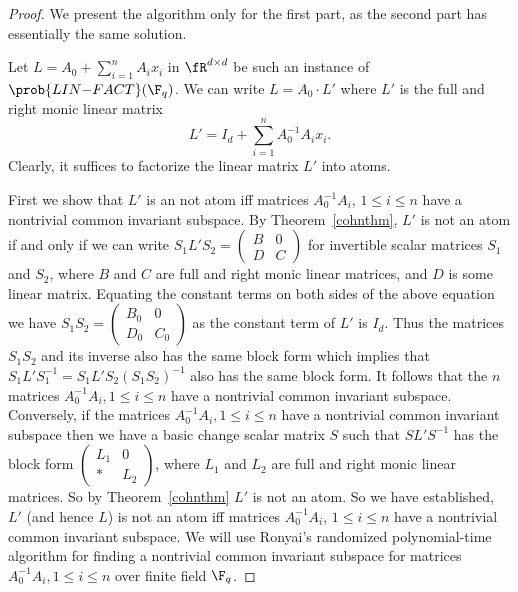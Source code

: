\begin{proof}
  We present the algorithm only for the first part, as the second part
  has essentially the same solution.
  
  Let $L=A_0+\sum_{i=1}^n A_i x_i$ in $\fR^{d\times d}$ be such an
  instance of $\prob{LIN{-}FACT}(\F_q)$. We can write $L=A_0\cdot
  L'$ where $L'$ is the full and right monic linear matrix
  \[
  L'= I_d + \sum_{i=1}^n A_0^{-1}A_i x_i.
  \]
 Clearly, it suffices to factorize the linear matrix $L'$ into
 atoms. 
 
First we show that $L'$ is an not atom iff matrices $A_0^{-1}A_i$, $1\leq i \leq n$ have a nontrivial common invariant subspace.  
 By Theorem~\ref{cohnthm}, $L'$ is not an atom if and only if
 we can write $S_1L'S_2 = \left(
\begin{array}{cc}
B & 0 \\
D & C
\end{array}
\right)$ for invertible scalar matrices $S_1$ and $S_2$, where $B$ and
$C$ are full and right monic linear matrices, and $D$ is some linear
matrix. Equating the constant terms on both sides of 
the above equation we have $S_1S_2= \left(
\begin{array}{cc}
  B_0 & 0 \\
  D_0 & C_0
\end{array}
\right)$ as the constant term of $L'$ is $I_d$.  Thus the matrices $S_1S_2$ and its inverse also has the
same block form which implies that
$S_1L'S_1^{-1}=S_1L'S_2(S_1S_2)^{-1}$ also has the same block form. It follows that the $n$ matrices $A_0^{-1}A_i, 1\le i\le n$ have
a nontrivial common invariant subspace. Conversely, if the matrices
$A_0^{-1}A_i, 1\le i\le n$ have a nontrivial common invariant subspace
then we have a basic change scalar matrix $S$ such that $SL'S^{-1}$ has
the block form $\left(
\begin{array}{cc}
  L_1 & 0 \\
  * & L_2
\end{array}
\right)$,
where $L_1$ and $L_2$ are full and right monic linear matrices. So by Theorem~\ref{cohnthm} $L'$ is not an atom. 
 So we have established, $L'$  (and hence $L$) is not an atom iff matrices $A_0^{-1}A_i$, $1\leq i \leq n$ have a nontrivial common invariant subspace.
We will use Ronyai's randomized polynomial-time algorithm for finding
a nontrivial common invariant subspace for matrices $A_0^{-1}A_i, 1\le
i\le n$ over finite field $\F_q$. 


\end{proof}
